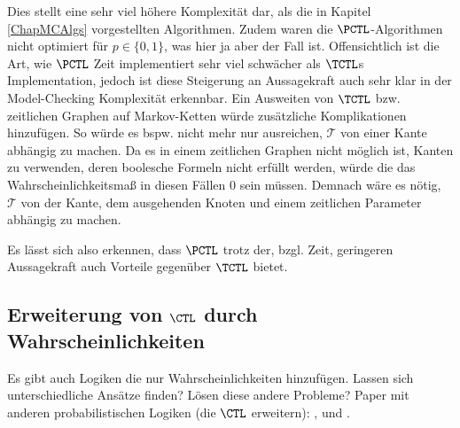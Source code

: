 Dies stellt eine sehr viel höhere Komplexität dar, als die in Kapitel \ref{ChapMCAlgs} vorgestellten Algorithmen.
Zudem waren die $\PCTL$-Algorithmen nicht optimiert für $p\in \{0,1\}$, was hier ja aber der Fall ist.
Offensichtlich ist die Art, wie $\PCTL$ Zeit implementiert sehr viel schwächer als $\TCTL$s Implementation, jedoch ist diese Steigerung an Aussagekraft auch sehr klar in der Model-Checking Komplexität erkennbar.
Ein Ausweiten von $\TCTL$ bzw. zeitlichen Graphen auf Markov-Ketten würde zusätzliche Komplikationen hinzufügen.
So würde es bspw. nicht mehr nur ausreichen, $\mathcal{T}$ von einer Kante abhängig zu machen.
Da es in einem zeitlichen Graphen nicht möglich ist, Kanten zu verwenden, deren boolesche Formeln nicht erfüllt werden, würde die das Wahrscheinlichkeitsmaß in diesen Fällen $0$ sein müssen.
Demnach wäre es nötig, $\mathcal{T}$ von der Kante, dem ausgehenden Knoten und einem zeitlichen Parameter abhängig zu machen.

Es lässt sich also erkennen, dass $\PCTL$ trotz der, bzgl. Zeit, geringeren Aussagekraft auch Vorteile gegenüber $\TCTL$ bietet.


\subsection{Erweiterung von $\CTL$ durch Wahrscheinlichkeiten}

Es gibt auch Logiken die nur Wahrscheinlichkeiten hinzufügen. Lassen sich unterschiedliche Ansätze finden? Lösen diese andere Probleme? Paper mit anderen probabilistischen Logiken (die $\CTL$ erweitern): \cite{hart1984probabilistic}, \cite{lehmann1982reasoning} und \cite{christoff1992reasoning}.